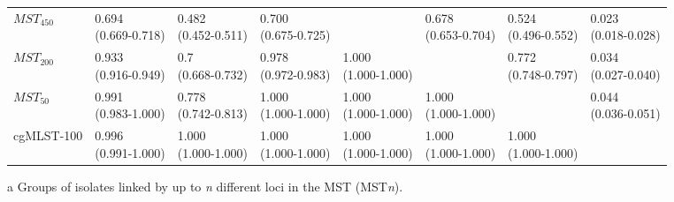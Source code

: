 \begin{table}[!ht]
{\begin{threeparttable}[b]
\begin{tabular}{@{}llllllll@{}}
        $MST_{450}$\tnote{a} & \Centerstack{0.694 \\ (0.669-0.718)} & \Centerstack{0.482 \\ (0.452-0.511)} & \Centerstack{0.700 \\ (0.675-0.725)} & & \Centerstack{0.678 \\ (0.653-0.704)} & \Centerstack{0.524 \\ (0.496-0.552)} & \Centerstack{0.023 \\ (0.018-0.028)} \\
        $MST_{200}$\tnote{a} & \Centerstack{0.933 \\ (0.916-0.949)} & \Centerstack{0.7 \\ (0.668-0.732)} & \Centerstack{0.978 \\ (0.972-0.983)} & \Centerstack{1.000 \\ (1.000-1.000)} & & \Centerstack{0.772 \\ (0.748-0.797)} & \Centerstack{0.034 \\ (0.027-0.040)} \\
        $MST_{50}$\tnote{a} & \Centerstack{0.991 \\ (0.983-1.000)} & \Centerstack{0.778 \\ (0.742-0.813)} & \Centerstack{1.000 \\ (1.000-1.000)} & \Centerstack{1.000 \\ (1.000-1.000)} & \Centerstack{1.000 \\ (1.000-1.000)} & & \Centerstack{0.044 \\ (0.036-0.051)} \\
        cgMLST-100 & \Centerstack{0.996 \\ (0.991-1.000)} & \Centerstack{1.000 \\ (1.000-1.000)} & \Centerstack{1.000 \\ (1.000-1.000)} & \Centerstack{1.000 \\ (1.000-1.000)} & \Centerstack{1.000 \\ (1.000-1.000)} & \Centerstack{1.000 \\ (1.000-1.000)} & \\
        \bottomrule
    \end{tabular}
    \begin{tablenotes}
       \item [a] {\footnotesize Groups of isolates linked by up to \textit{n} different loci in the MST (MST\textit{n}).}
    \end{tablenotes}
    \end{threeparttable}
    }
\end{table}
